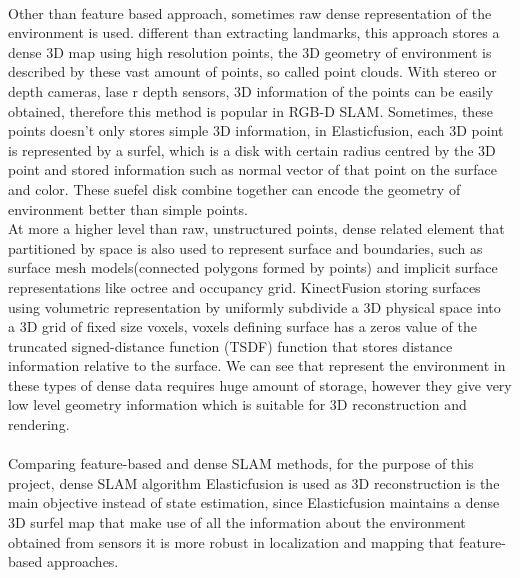 \documentclass[12pt,twoside]{article}
\begin{document}
\\
Other than feature based approach, sometimes raw dense representation of the environment is used. different than extracting landmarks, this approach stores a dense 3D map using high resolution points, the 3D geometry of environment is described by these vast amount of points, so called point clouds. With stereo or depth cameras, lase r depth sensors, 3D information of the points can be easily obtained, therefore this method is popular in RGB-D SLAM. Sometimes, these points doesn't only stores simple 3D information, in Elasticfusion\citep{whelan2016elasticfusion}, each 3D point is represented by a surfel, which is a disk with certain radius centred by the 3D point and stored information such as normal vector of that point on the surface and color. These suefel disk combine together can encode the geometry of environment better than simple points.\\
At more a higher level than raw, unstructured points, dense related element that partitioned by space is also used to represent surface and boundaries, such as surface mesh models(connected polygons formed by points) and implicit surface representations like octree and occupancy grid. KinectFusion\citep{newcombe2011kinectfusion} storing surfaces using volumetric representation by uniformly subdivide a 3D physical space into a 3D grid of fixed size voxels, voxels defining surface has a zeros value of the truncated signed-distance function (TSDF) function that stores distance information relative to the surface. We can see that represent the environment in these types of dense data requires huge amount of storage, however they give very low level geometry information which is suitable for 3D reconstruction and rendering.\\
\\
Comparing feature-based and dense SLAM methods, for the purpose of this project, dense SLAM algorithm Elasticfusion\citep{whelan2016elasticfusion} is used as 3D reconstruction is the main objective instead of state estimation, since Elasticfusion maintains a dense 3D surfel map that make use of all the information about the environment obtained from sensors it is more robust in localization and mapping that feature-based approaches.\\
\end{document}
